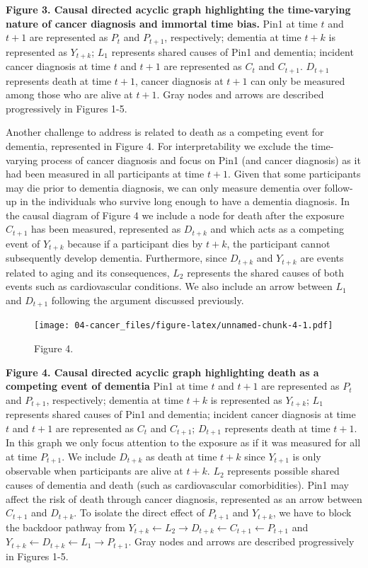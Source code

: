 \documentclass[
]{book}
\begin{document}
\textbf{Figure 3. Causal directed acyclic graph highlighting the time-varying nature of cancer diagnosis and immortal time bias.} Pin1 at time \(t\) and \(t+1\) are represented as \(P_t\) and \(P_{t+1}\), respectively; dementia at time \(t+k\) is represented as \(Y_{t+k}\); \(L_1\) represents shared causes of Pin1 and dementia; incident cancer diagnosis at time \(t\) and \(t+1\) are represented as \(C_t\) and \(C_{t+1}\). \(D_{t+1}\) represents death at time \(t+1\), cancer diagnosis at \(t+1\) can only be measured among those who are alive at \(t+1\). Gray nodes and arrows are described progressively in Figures 1-5.

Another challenge to address is related to death as a competing event for dementia, represented in Figure 4. For interpretability we exclude the time-varying process of cancer diagnosis and focus on Pin1 (and cancer diagnosis) as it had been measured in all participants at time \(t+1\). Given that some participants may die prior to dementia diagnosis, we can only measure dementia over follow-up in the individuals who survive long enough to have a dementia diagnosis. In the causal diagram of Figure 4 we include a node for death after the exposure \(C_{t+1}\) has been measured, represented as \(D_{t+k}\) and which acts as a competing event of \(Y_{t+k}\) because if a participant dies by \(t + k\), the participant cannot subsequently develop dementia. Furthermore, since \(D_{t+k}\) and \(Y_{t+k}\) are events related to aging and its consequences, \(L_2\) represents the shared causes of both events such as cardiovascular conditions. We also include an arrow between \(L_1\) and \(D_{t+1}\) following the argument discussed previously.

\begin{figure}
\centering
\texttt{[image: 04-cancer\_files/figure-latex/unnamed-chunk-4-1.pdf]}
\caption{\label{fig:unnamed-chunk-4}Figure 4.}
\end{figure}

\textbf{Figure 4. Causal directed acyclic graph highlighting death as a competing event of dementia} Pin1 at time \(t\) and \(t+1\) are represented as \(P_t\) and \(P_{t+1}\), respectively; dementia at time \(t+k\) is represented as \(Y_{t+k}\); \(L_1\) represents shared causes of Pin1 and dementia; incident cancer diagnosis at time \(t\) and \(t+1\) are represented as \(C_t\) and \(C_{t+1}\); \(D_{t+1}\) represents death at time \(t+1\). In this graph we only focus attention to the exposure as if it was measured for all at time \(P_{t+1}\). We include \(D_{t+k}\) as death at time \(t+k\) since \(Y_{t+1}\) is only observable when participants are alive at \(t+k\). \(L_2\) represents possible shared causes of dementia and death (such as cardiovascular comorbidities). Pin1 may affect the risk of death through cancer diagnosis, represented as an arrow between \(C_{t+1}\) and \(D_{t+k}\). To isolate the direct effect of \(P_{t+1}\) and \(Y_{t+k}\), we have to block the backdoor pathway from \(Y_{t+k} \leftarrow L_2 \rightarrow D_{t+k} \leftarrow C_{t+1} \leftarrow P_{t+1}\) and \(Y_{t+k} \leftarrow D_{t+k} \leftarrow L_1 \rightarrow P_{t+1}\). Gray nodes and arrows are described progressively in Figures 1-5.
\end{document}
